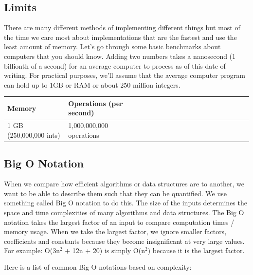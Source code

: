\documentclass[11pt,oneside]{book}
\begin{document}
\subsection{Limits}

There are many different methods of implementing different things but most of the time we care most about implementations that are the fastest and use the least amount of memory. Let's go through some basic benchmarks about computers that you should know. Adding two numbers takes a nanosecond (1 billionth of a second) for an average computer to process as of this date of writing. For practical purposes, we'll assume that the average computer program can hold up to 1GB or RAM or about 250 million integers.

\vspace{10px}\begin{tabulary}{0.4\linewidth}{|l|l|l|l|l|l|l|l|l|l|l|l|l|l|l|l|l|l|l}\hline


  Memory &
  Operations (per second)\\
\hline


  1 GB (250,000,000 ints) &
  1,000,000,000 operations\\

\hline\end{tabulary}

\subsection{Big O Notation}

When we compare how efficient algorithms or data structures are to another, we want to be able to describe them such that they can be quantified. We use something called Big O notation to do this. The size of the inputs determines the space and time complexities of many algorithms and data structures. The Big O notation takes the largest factor of an input to compare computation times / memory usage. When we take the largest factor, we ignore smaller factors, coefficients and constants because they become insignificant at very large values. For example: O(3n$^{2}$ + 12n + 20) is simply O(n$^{2}$) because it is the largest factor.

Here is a list of common Big O notations based on complexity:
\end{document}
